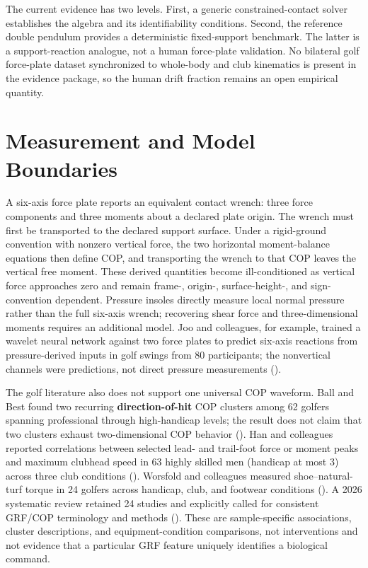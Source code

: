\documentclass[
  letterpaper,
]{report}
\begin{document}
The current evidence has two levels. First, a generic
constrained-contact solver establishes the algebra and its
identifiability conditions. Second, the reference double pendulum
provides a deterministic fixed-support benchmark. The latter is a
support-reaction analogue, not a human force-plate validation. No
bilateral golf force-plate dataset synchronized to whole-body and club
kinematics is present in the evidence package, so the human drift
fraction remains an open empirical quantity.

\section{Measurement and Model
Boundaries}\label{measurement-and-model-boundaries}

A six-axis force plate reports an equivalent contact wrench: three force
components and three moments about a declared plate origin. The wrench
must first be transported to the declared support surface. Under a
rigid-ground convention with nonzero vertical force, the two horizontal
moment-balance equations then define COP, and transporting the wrench to
that COP leaves the vertical free moment. These derived quantities
become ill-conditioned as vertical force approaches zero and remain
frame-, origin-, surface-height-, and sign-convention dependent.
Pressure insoles directly measure local normal pressure rather than the
full six-axis wrench; recovering shear force and three-dimensional
moments requires an additional model. Joo and colleagues, for example,
trained a wavelet neural network against two force plates to predict
six-axis reactions from pressure-derived inputs in golf swings from 80
participants; the nonvertical channels were predictions, not direct
pressure measurements ().

The golf literature also does not support one universal COP waveform.
Ball and Best found two recurring \textbf{direction-of-hit} COP clusters
among 62 golfers spanning professional through high-handicap levels; the
result does not claim that two clusters exhaust two-dimensional COP
behavior (). Han and
colleagues reported correlations between selected lead- and trail-foot
force or moment peaks and maximum clubhead speed in 63 highly skilled
men (handicap at most 3) across three club conditions
(). Worsfold and colleagues
measured shoe--natural-turf torque in 24 golfers across handicap, club,
and footwear conditions (). A 2026 systematic review retained 24 studies and
explicitly called for consistent GRF/COP terminology and methods
(). These are
sample-specific associations, cluster descriptions, and
equipment-condition comparisons, not interventions and not evidence that
a particular GRF feature uniquely identifies a biological command.
\end{document}
